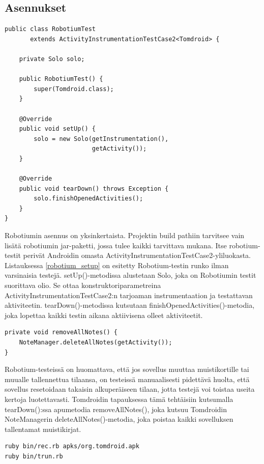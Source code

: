 \subsection{Asennukset}

\begin{lstlisting}[float,label=robotium_setup,caption=Robotium testirunko]
public class RobotiumTest 
       extends ActivityInstrumentationTestCase2<Tomdroid> {

	private Solo solo;
	
	public RobotiumTest() {
		super(Tomdroid.class);
	}
	
	@Override
	public void setUp() {
		solo = new Solo(getInstrumentation(), 
		                getActivity());
	}
	
	@Override
	public void tearDown() throws Exception {
		solo.finishOpenedActivities();
	}
}
\end{lstlisting}

Robotiumin asennus on yksinkertaista. Projektin build pathiin tarvitsee vain lisätä robotiumin jar-paketti, jossa tulee kaikki tarvittava mukana. Itse robotium-testit perivät Androidin omasta ActivityInstrumentationTestCase2-yliluokasta. Listauksessa \ref{robotium_setup} on esitetty Robotium-testin runko ilman varsinaisia testejä. setUp()-metodissa alustetaan Solo, joka on Robotiumin testit suorittava olio. Se ottaa konstruktoriparametreina ActivityInstrumentationTestCase2:n tarjoaman instrumentaation ja testattavan aktiviteetin. tearDown()-metodissa kutsutaan finishOpenedActivities()-metodia, joka lopettaa kaikki testin aikana aktiivisena olleet aktiviteetit.

\begin{lstlisting}[float,label=delete_notes,caption=Muistikirjojen poisto]
private void removeAllNotes() {
	NoteManager.deleteAllNotes(getActivity());
}
\end{lstlisting}

Robotium-testeissä on huomattava, että jos sovellus muuttaa muistikortille tai muualle tallennettua tilaansa, on testeissä manuaalisesti pidettävä huolta, että sovellus resetoidaan takaisin alkuperäiseen tilaan, jotta testejä voi toistaa useita kertoja luotettavasti. Tomdroidin tapauksessa tämä tehtäisiin kutsumalla tearDown():ssa apumetodia removeAllNotes(), joka kutsuu Tomdroidin NoteManagerin deleteAllNotes()-metodia, joka poistaa kaikki sovelluksen tallentamat muistikirjat.

\begin{lstlisting}[float, label=troyd_run, caption=Troyd-nauhoitusskriptin ja testien ajaminen]
ruby bin/rec.rb apks/org.tomdroid.apk
ruby bin/trun.rb
\end{lstlisting}

